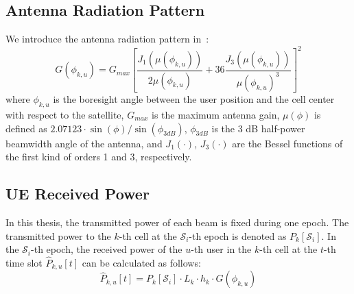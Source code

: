 \subsection{Antenna Radiation Pattern}
We introduce the antenna radiation pattern in~\cite{Energy-Efficient}:
\begin{equation}
    G(\phi_{k,u}) = G_{max} \left[ \frac{J_1\left(\mu(\phi_{k,u})\right)}{2\mu(\phi_{k,u})}
    + 36 \frac{J_3\left(\mu(\phi_{k,u})\right)}{\mu(\phi_{k,u})^3} \right]^2
\end{equation}
where $\phi_{k,u}$ is the boresight angle between the user position and the cell center with respect to the satellite, $G_{max}$ is the maximum antenna gain, $\mu(\phi)$ is defined as $2.07123 \cdot \sin(\phi)/\sin(\phi_{3dB})$, $\phi_{3dB}$ is the 3 dB half-power beamwidth angle of the antenna, and $J_1(\cdot)$, $J_3(\cdot)$ are the Bessel functions of the first kind of orders 1 and 3, respectively.

\subsection{UE Received Power}
In this thesis, the transmitted power of each beam is fixed during one epoch. The transmitted power to the $k$-th cell at the $\mathcal{S}_i$-th epoch is denoted as $P_{k}[\mathcal{S}_i]$. In the $\mathcal{S}_i$-th epoch, the received power of the $u$-th user in the $k$-th cell at the $t$-th time slot $\hat{P}_{k,u}[t]$ can be calculated as follows:
\begin{equation}
    \hat{P}_{k,u}[t] = P_{k}[\mathcal{S}_i] \cdot L_{k} \cdot h_{k} \cdot G(\phi_{k,u}) \label{eq:T-R}
\end{equation}

